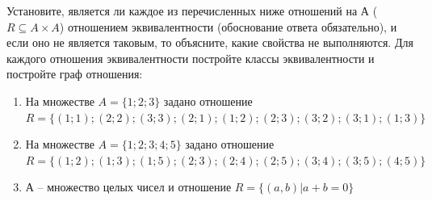 \question
Установите, является ли каждое из перечисленных ниже отношений на А ($R \subseteq A \times A$) отношением эквивалентности (обоснование ответа обязательно), и если оно не является таковым, то объясните, какие свойства не выполняются. Для каждого отношения эквивалентности постройте классы эквивалентности и постройте граф отношения:
\begin{enumerate}
	\renewcommand{\labelenumi}{\alph{enumi})}
	\item На множестве $A = \{1; 2; 3\}$ задано отношение $R = \{(1; 1); (2; 2); (3; 3); (2; 1); (1; 2); (2; 3); (3; 2); (3; 1); (1; 3)\}$
	\item На множестве $A = \{1; 2; 3; 4; 5\}$ задано отношение $R = \{(1; 2); (1; 3); (1; 5); (2; 3); (2; 4); (2; 5); (3; 4); (3; 5); (4; 5)\}$
	\item А -- множество целых чисел и отношение $R = \{(a,b)|a + b = 0\}$
\end{enumerate}